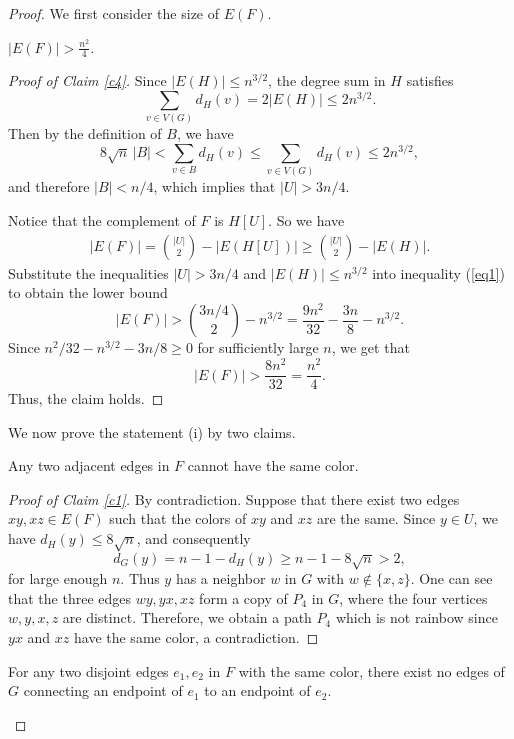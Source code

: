 \documentclass[10pt,a4paper]{amsart}
\begin{document}
\begin{proof}

We first consider the size of $E(F)$.

\begin{claim}\label{c4}
$|E(F)|>\frac{n^2}{4}$.
\end{claim}

\begin{proof}[Proof of Claim \ref{c4}]
Since $|E(H)|\le n^{3/2}$, the degree sum in $H$ satisfies
\[
\sum_{v\in V(G)}d_H(v)=2|E(H)|\le 2n^{3/2}.
\]
Then by the definition of $B$, we have
\[
8\sqrt n\,|B|<\sum_{v\in B}d_H(v)\le \sum_{v\in V(G)}d_H(v)\le 2n^{3/2},
\]
and therefore $|B|<n/4$, which implies that $|U|>3n/4$. 

Notice that the complement of $F$  is $H[U]$.  So we have
\begin{align}\label{eq1}
|E(F)|=\binom{|U|}{2}-|E(H[U])|
       \ge \binom{|U|}{2}-|E(H)|.
\end{align}
Substitute the inequalities $|U|>3n/4$ and $|E(H)|\le n^{3/2}$ into inequality (\ref{eq1}) to obtain the lower bound
\[
|E(F)|>\binom{3n/4}{2}-n^{3/2}
       =\frac{9n^2}{32}-\frac{3n}{8}-n^{3/2}.
\]
Since $n^2/32-n^{3/2}-3n/8\ge 0$ for  sufficiently large $n$,
we get that 
\[
|E(F)|> \frac{8n^2}{32}=\frac{n^2}{4}.
\]
Thus, the claim holds.
\end{proof}

We now prove the statement (i) by two claims. 

\begin{claim}\label{c1}
Any two adjacent edges in $F$ cannot have the same color. 
\end{claim}

\begin{proof}[Proof of Claim \ref{c1}]
By contradiction. 
Suppose that there exist two edges $xy,xz\in E(F)$ such that the colors of $xy$ and $xz$ are the same.  
Since $y\in U$, we have
$d_H(y)\le 8\sqrt n$, and consequently
\[
d_G(y)=n-1-d_H(y)\ge n-1-8\sqrt n>2,
\]
for large enough $n$. 
Thus $y$ has a neighbor $w$ in $G$ with $w\notin\{x,z\}$.  
One can see that the three edges $wy,yx,xz$ form a copy of $P_4$ in $G$, where the four vertices $w,y,x,z$ are distinct.  
Therefore, we obtain a path $P_4$ which  is not rainbow since $yx$ and $xz$ have the same color, a contradiction.  
\end{proof}


\begin{claim}\label{c2}
For any two disjoint edges  $e_1, e_2$ in $F$ with the same color, there exist no edges of $G$ connecting an endpoint of $e_1$ to an endpoint of $e_2$. 
\end{claim}


\end{proof}
\end{document}

